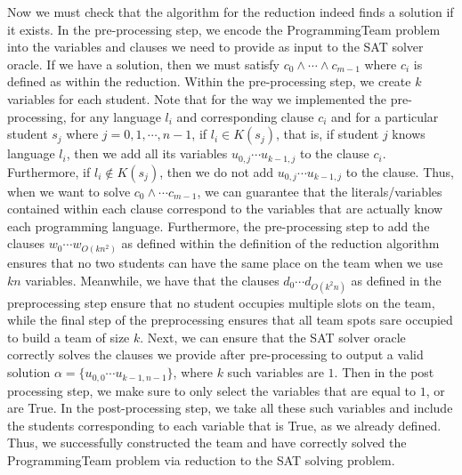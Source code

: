 \documentclass[11pt]{article}
\begin{document}
\begin{enumerate}
\begin{enumerate}
Now we must check that the algorithm for the reduction indeed finds a solution if it exists. In the pre-processing step, we encode the ProgrammingTeam problem into the variables and clauses we need to provide as input to the SAT solver oracle. If we have a solution, then we must satisfy $c_0 \wedge \cdots \wedge c_{m-1}$ where $c_i$ is defined as within the reduction. Within the pre-processing step, we create $k$ variables for each student. Note that for the way we implemented the pre-processing, for any language $l_i$ and corresponding clause $c_i$ and for a particular student $s_j$ where $j=0, 1, \cdots, n-1$, if $l_i \in K(s_j)$, that is, if student $j$ knows language $l_i$, then we add all its variables $u_{0, j} \cdots u_{k-1, j}$ to the clause $c_i$. Furthermore, if $l_i \notin K(s_j)$, then we do not add $u_{0, j} \cdots u_{k-1, j}$ to the clause. Thus, when we want to solve $c_0 \wedge \cdots c_{m-1}$, we can guarantee that the literals/variables contained within each clause correspond to the variables that are actually know each programming language. Furthermore, the pre-processing step to add the clauses $w_0 \cdots w_{O(kn^2)}$ as defined within the definition of the reduction algorithm ensures that no two students can have the same place on the team when we use $kn$ variables. Meanwhile, we have that the clauses $d_0 \cdots d_{O(k^2n)}$ as defined in the preprocessing step ensure that no student occupies multiple slots on the team, while the final step of the preprocessing ensures that all team spots sare occupied to build a team of size $k$. Next, we can ensure that the SAT solver oracle correctly solves the clauses we provide after pre-processing to output a valid solution $\alpha = \{u_{0, 0} \cdots u_{k-1, n-1}\}$, where $k$ such variables are $1$. Then in the post processing step, we make sure to only select the variables that are equal to $1$, or are True. In the post-processing step, we take all these such variables and include the students corresponding to each variable that is True, as we already defined. Thus, we successfully constructed the team and have correctly solved the ProgrammingTeam problem via reduction to the SAT solving problem. \\


\end{enumerate}
\end{enumerate}
\end{document}
